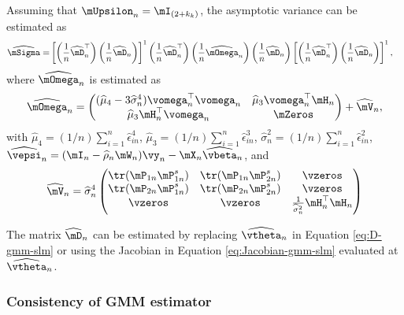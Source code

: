 Assuming that $\mUpsilon_n = \mI_{(2 + k_k)}$, the asymptotic variance can be estimated as
\begin{equation*}
\begin{aligned}
  \widehat{\mSigma} = &  \left[\left(\frac{1}{n}\widehat{\mD}_n^\top\right)\left(\frac{1}{n}\widehat{\mD}_n\right)\right]^{1}\left(\frac{1}{n}\widehat{\mD}_n^\top\right)\left(\frac{1}{n}\widehat{\mOmega}_n\right)\left(\frac{1}{n}\widehat{\mD}_n\right) \left[\left(\frac{1}{n}\widehat{\mD}_n^\top\right)\left(\frac{1}{n}\widehat{\mD}_n\right)\right]^{1},
  \end{aligned}
\end{equation*}
%
where $\widehat{\mOmega}_n$ is estimated as
\begin{equation}\label{eq:omega-slm-hat}
\widehat{\mOmega}_n = \begin{pmatrix}
              (\widehat{\mu}_4 - 3\widehat{\sigma}_n^4)\vomega_n^\top\vomega_n & \widehat{\mu}_3\vomega^\top_n\mH_n \\
              \widehat{\mu}_3 \mH_n^\top\vomega_n & \mZeros 
            \end{pmatrix}
             + 
             \widehat{\mV}_n,
\end{equation}
%
with $\widehat{\mu}_4 = (1/n)\sum_{i  = 1}^n\widehat{\epsilon}_{in}^4$, $\widehat{\mu}_3 = (1/n)\sum_{i  = 1}^n\widehat{\epsilon}_{in}^3$, $\widehat{\sigma}_n^2 = (1/n)\sum_{i = 1}^n\widehat{\epsilon}_{in}^2$,  $\widehat{\vepsi}_n = (\mI_n - \widehat{\rho}_n\mW_n)\vy_n - \mX_n\widehat{\vbeta}_n$, and 
\begin{equation*}
  \widehat{\mV}_n = \widehat{\sigma}_n^4
          \begin{pmatrix}
          \tr(\mP_{1n}\mP_{1n}^s) & \tr(\mP_{1n}\mP_{2n}^s) & \vzeros \\
          \tr(\mP_{2n}\mP_{1n}^s) & \tr(\mP_{2n}\mP_{2n}^s) & \vzeros \\
          \vzeros & \vzeros & \frac{1}{\widehat{\sigma}_n^2}\mH_n^\top\mH_n
          \end{pmatrix}
\end{equation*}

The matrix $\widehat{\mD}_n$ can be estimated by replacing $\widehat{\vtheta}_n$ in Equation \eqref{eq:D-gmm-slm} or using the Jacobian in Equation \eqref{eq:Jacobian-gmm-slm} evaluated at $\widehat{\vtheta}_n$. 

\subsubsection{Consistency of GMM estimator}

